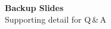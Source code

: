 \begin{frame}
  \centering
  \vfill
  {\Large\textbf{Backup Slides}}\\[0.5em]
  {\footnotesize Supporting detail for Q\,\&\,A}
  \vfill
\end{frame}
